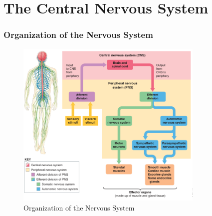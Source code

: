 \documentclass[10pt]{article}
\begin{document}
\newpage
\part{The Central Nervous System}

\section{Organization of the Nervous System}
\begin{figure}[h]
    \centering
    \includegraphics[width=0.8\textwidth]{nervousSystem}
    \caption{Organization of the Nervous System}
    \label{fig:nervousSystem}
\end{figure}
\end{document}
